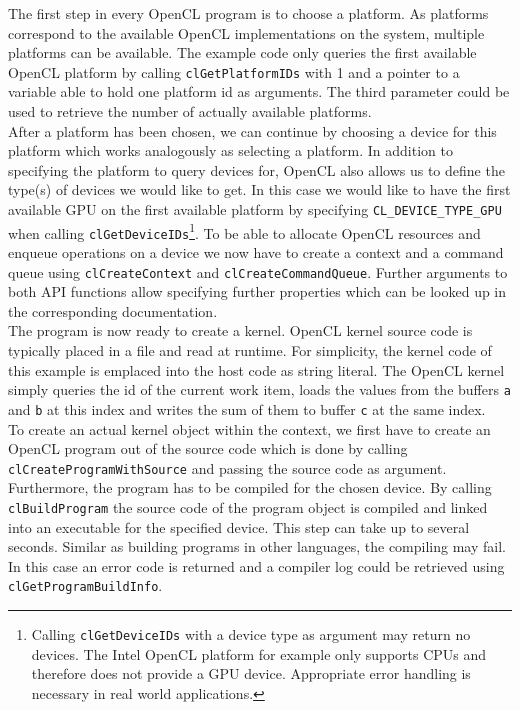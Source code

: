 The first step in every OpenCL program is to choose a platform. As platforms correspond to the available OpenCL implementations on the system, multiple platforms can be available. The example code only queries the first available OpenCL platform by calling \lstinline!clGetPlatformIDs! with 1 and a pointer to a variable able to hold one platform id as arguments. The third parameter could be used to retrieve the number of actually available platforms. \\
After a platform has been chosen, we can continue by choosing a device for this platform which works analogously as selecting a platform. In addition to specifying the platform to query devices for, OpenCL also allows us to define the type(s) of devices we would like to get. In this case we would like to have the first available GPU on the first available platform by specifying \lstinline!CL_DEVICE_TYPE_GPU! when calling \lstinline!clGetDeviceIDs!\footnote{Calling \lstinline!clGetDeviceIDs! with a device type as argument may return no devices. The Intel OpenCL platform for example only supports CPUs and therefore does not provide a GPU device. Appropriate error handling is necessary in real world applications.}. To be able to allocate OpenCL resources and enqueue operations on a device we now have to create a context and a command queue using \lstinline!clCreateContext! and \lstinline!clCreateCommandQueue!. Further arguments to both API functions allow specifying further properties which can be looked up in the corresponding documentation. \\
The program is now ready to create a kernel. OpenCL kernel source code is typically placed in a file and read at runtime. For simplicity, the kernel code of this example is emplaced into the host code as string literal. The OpenCL kernel simply queries the id of the current work item, loads the values from the buffers \lstinline!a! and \lstinline!b! at this index and writes the sum of them to buffer \lstinline!c! at the same index. \\
To create an actual kernel object within the context, we first have to create an OpenCL program out of the source code which is done by calling \lstinline!clCreateProgramWithSource! and passing the source code as argument. Furthermore, the program has to be compiled for the chosen device. By calling \lstinline!clBuildProgram! the source code of the program object is compiled and linked into an executable for the specified device. This step can take up to several seconds. Similar as building programs in other languages, the compiling may fail. In this case an error code is returned and a compiler log could be retrieved using \lstinline!clGetProgramBuildInfo!.
